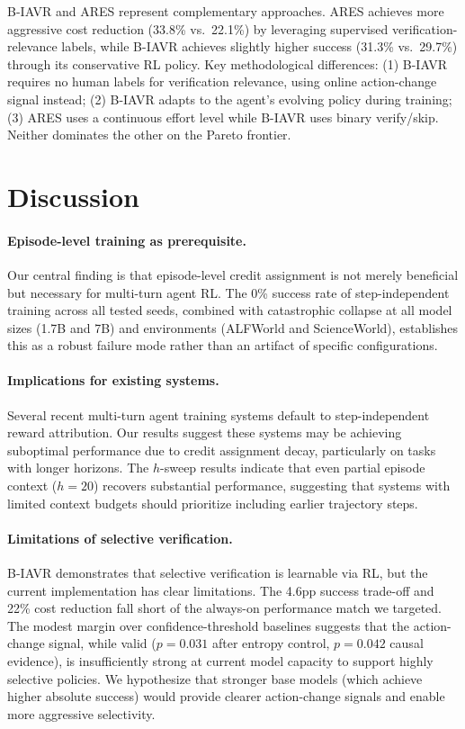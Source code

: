 \documentclass{article}
\begin{document}
B-IAVR and ARES represent complementary approaches. ARES achieves more aggressive cost reduction (33.8\% vs.\ 22.1\%) by leveraging supervised verification-relevance labels, while B-IAVR achieves slightly higher success (31.3\% vs.\ 29.7\%) through its conservative RL policy. Key methodological differences: (1) B-IAVR requires no human labels for verification relevance, using online action-change signal instead; (2) B-IAVR adapts to the agent's evolving policy during training; (3) ARES uses a continuous effort level while B-IAVR uses binary verify/skip. Neither dominates the other on the Pareto frontier.

\section{Discussion}

\paragraph{Episode-level training as prerequisite.}
Our central finding is that episode-level credit assignment is not merely beneficial but necessary for multi-turn agent RL. The 0\% success rate of step-independent training across all tested seeds, combined with catastrophic collapse at all model sizes (1.7B and 7B) and environments (ALFWorld and ScienceWorld), establishes this as a robust failure mode rather than an artifact of specific configurations.

\paragraph{Implications for existing systems.}
Several recent multi-turn agent training systems default to step-independent reward attribution. Our results suggest these systems may be achieving suboptimal performance due to credit assignment decay, particularly on tasks with longer horizons. The $h$-sweep results indicate that even partial episode context ($h=20$) recovers substantial performance, suggesting that systems with limited context budgets should prioritize including earlier trajectory steps.

\paragraph{Limitations of selective verification.}
B-IAVR demonstrates that selective verification is learnable via RL, but the current implementation has clear limitations. The 4.6pp success trade-off and 22\% cost reduction fall short of the always-on performance match we targeted. The modest margin over confidence-threshold baselines suggests that the action-change signal, while valid ($p = 0.031$ after entropy control, $p = 0.042$ causal evidence), is insufficiently strong at current model capacity to support highly selective policies. We hypothesize that stronger base models (which achieve higher absolute success) would provide clearer action-change signals and enable more aggressive selectivity.
\end{document}
